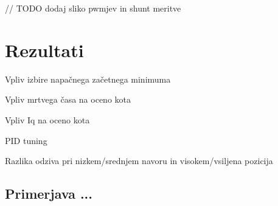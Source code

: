 \documentclass[a4paper,twoside,openright,12pt,slovene]{book}
\begin{document}
// TODO dodaj sliko pwmjev in shunt meritve


%
%
%
%
%
%



\section{Rezultati} \label{rezultati}

Vpliv izbire napačnega začetnega minimuma

Vpliv mrtvega časa na oceno kota

Vpliv Iq na oceno kota

PID tuning

Razlika odziva pri nizkem/srednjem navoru in visokem/vsiljena pozicija

\subsection{Primerjava ...} \label{graf1}
\end{document}
